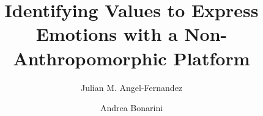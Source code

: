 %
%
%
%
%
%
\RequirePackage{fix-cm}
%
\documentclass[twocolumn]{svjour3}          %
%
\smartqed  %
%
\usepackage{graphicx}
\usepackage{slashbox}     
\usepackage{subfigure}
\usepackage{breakcites}

%
%
%
%
%


\title{Identifying Values to Express Emotions with a Non-Anthropomorphic Platform%
}


\author{Julian M. Angel-Fernandez         \and
        Andrea Bonarini %
}

